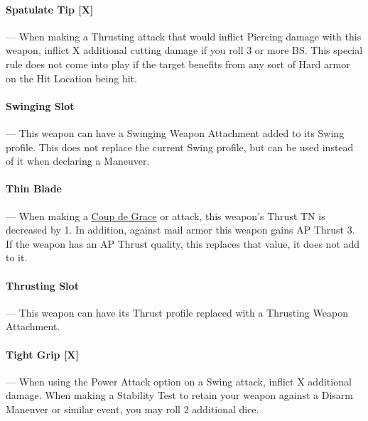 \documentclass[oneside,11pt,english]{book}
\begin{document}
\vspace{-5pt}\paragraph[Spatulate Tip]{\label{wepqual:Spatulate Tip}Spatulate Tip [X]}---\quad
When making a Thrusting attack that would inflict Piercing damage with this weapon, inflict X additional cutting damage if you roll 3 or more BS. This special rule does not come into play if the target benefits from any sort of Hard armor on the Hit Location being hit.

\vspace{-5pt}\paragraph{\label{wepqual:Swinging Slot}Swinging Slot}---\quad
This weapon can have a Swinging Weapon Attachment added to its Swing profile. This does not replace the current Swing profile, but can be used instead of it when declaring a Maneuver.

\vspace{-5pt}\paragraph{\label{wepqual:Thin Blade}Thin Blade}---\quad
When making a \hyperref[man:Grappling: Coup de Grace]{Coup de Grace} or  attack, this weapon’s Thrust TN is decreased by 1. In addition, against mail armor this weapon gains AP Thrust 3. If the weapon has an AP Thrust quality, this replaces that value, it does not add to it.

\vspace{-5pt}\paragraph{\label{wepqual:Thrusting Slot}Thrusting Slot}---\quad
This weapon can have its Thrust profile replaced with a Thrusting Weapon Attachment.

\vspace{-5pt}\paragraph[Tight Grip]{\label{wepqual:Tight Grip}Tight Grip [X]}---\quad
When using the Power Attack option on a Swing attack, inflict X additional damage. When making a Stability Test to retain your weapon against a Disarm Maneuver or similar event, you may roll 2 additional dice.
\end{document}
